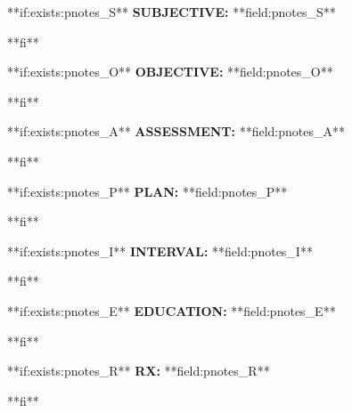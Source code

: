 \documentclass{article}
\newcommand{\sheading}[1]{\textbf{#1:}}
\begin{document}
**if:exists:pnotes_S**
\sheading{SUBJECTIVE} **field:pnotes_S**
\par
**fi**

**if:exists:pnotes_O**
\sheading{OBJECTIVE} **field:pnotes_O**
\par
**fi**

**if:exists:pnotes_A**
\sheading{ASSESSMENT} **field:pnotes_A**
\par
**fi**

**if:exists:pnotes_P**
\sheading{PLAN} **field:pnotes_P**
\par
**fi**

**if:exists:pnotes_I**
\sheading{INTERVAL} **field:pnotes_I**
\par
**fi**

**if:exists:pnotes_E**
\sheading{EDUCATION} **field:pnotes_E**
\par
**fi**

**if:exists:pnotes_R**
\sheading{RX} **field:pnotes_R**
\par
**fi**
\end{document}

